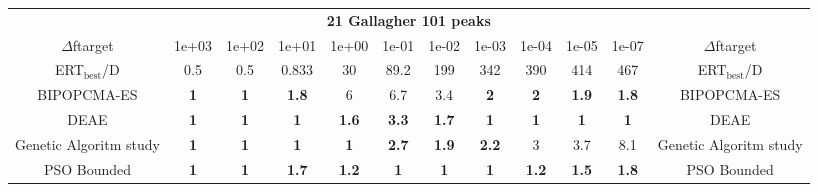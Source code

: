 \begin{tabular}{cccccccccccc}
 & \multicolumn{10}{c}{{\normalsize \textbf{21 Gallagher 101 peaks}}}\\
$\Delta$ftarget& 1e+03& 1e+02& 1e+01& 1e+00& 1e-01& 1e-02& 1e-03& 1e-04& 1e-05& 1e-07 & $\Delta$ftarget \\
ERT$_{\textrm{best}}$/D& 0.5& 0.5& 0.833& 30& 89.2& 199& 342& 390& 414& 467 & ERT$_{\textrm{best}}$/D \\
\hline
BIPOPCMA-ES & \textbf{1} & \textbf{1} & \textbf{1.8} & 6 & 6.7 & 3.4 & \textbf{2} & \textbf{2} & \textbf{1.9} & \textbf{1.8} & BIPOPCMA-ES \cite{add_an_entry_for_BIPOPCMA-ES_in_bbob.bib}\\
DEAE & \textbf{1} & \textbf{1} & \textbf{1} & \textbf{1.6} & \textbf{3.3} & \textbf{1.7} & \textbf{1} & \textbf{1} & \textbf{1} & \textbf{1} & DEAE \cite{add_an_entry_for_DEAE_in_bbob.bib}\\
Genetic Algoritm study & \textbf{1} & \textbf{1} & \textbf{1} & \textbf{1} & \textbf{2.7} & \textbf{1.9} & \textbf{2.2} & 3 & 3.7 & 8.1 & Genetic Algoritm study \cite{add_an_entry_for_Genetic Algoritm study_in_bbob.bib}\\
PSO Bounded & \textbf{1} & \textbf{1} & \textbf{1.7} & \textbf{1.2} & \textbf{1} & \textbf{1} & \textbf{1} & \textbf{1.2} & \textbf{1.5} & \textbf{1.8} & PSO Bounded \cite{add_an_entry_for_PSO Bounded_in_bbob.bib}
\end{tabular}
